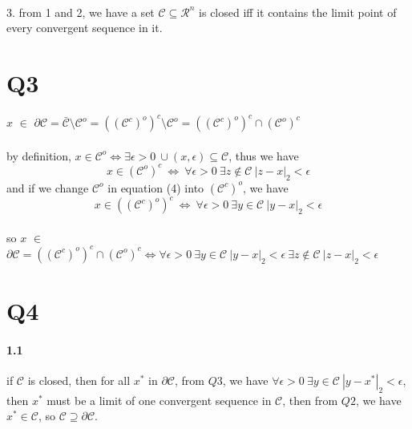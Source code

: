 \documentclass{article}
\begin{document}
    \paragraph{}
      3. from 1 and 2, we have a set $\mathcal{C} \subseteq \mathcal{R}^n$ is closed iff it contains the limit point of every convergent sequence in it.

\section{Q3}
  \paragraph{}
  $x$ $\in$ $\partial\mathcal{C} = \bar{\mathcal{C}} \setminus \mathcal{C}^o = ((\mathcal{C}^c)^o)^c \setminus \mathcal{C}^o = ((\mathcal{C}^c)^o)^c \cap (\mathcal{C}^o)^c$
  \paragraph{}
    by definition, $x \in \mathcal{C}^o \iff \exists \epsilon > 0\ \cup(x, \epsilon) \subseteq \mathcal{C}$, thus we have
    \begin{equation}
      x \in (\mathcal{C}^o)^c\ \iff\ \forall \epsilon > 0\ \exists z \not\in \mathcal{C}\ |z - x|_2 < \epsilon
    \end{equation}
    and if we change $\mathcal{C}^o$ in equation (4) into $(\mathcal{C}^c)^o$, we have
    \begin{equation}
      x \in ((\mathcal{C}^c)^o)^c\ \iff\ \forall \epsilon > 0\ \exists y \in \mathcal{C}\ |y - x|_2 < \epsilon
    \end{equation}
  \paragraph{}
    so $x$ $\in$ $\partial\mathcal{C} = ((\mathcal{C}^c)^o)^c \cap (\mathcal{C}^o)^c \iff \forall \epsilon > 0\ \exists y \in \mathcal{C}\ |y - x|_2 < \epsilon\ \exists z \not\in \mathcal{C}\ |z - x|_2 < \epsilon$

\section{Q4}
  \paragraph{1.1} if $\mathcal{C}$ is closed,  then for all $x^*$ in $\partial \mathcal{C}$, from $Q3$, we have $\forall \epsilon > 0\ \exists y \in \mathcal{C}\ |y - x^*|_2 < \epsilon$, then $x^*$ must be a limit of one convergent sequence in $\mathcal{C}$, then from $Q2$, we have $x^* \in \mathcal{C}$, so $\mathcal{C} \supseteq \partial \mathcal{C}$.
\end{document}
